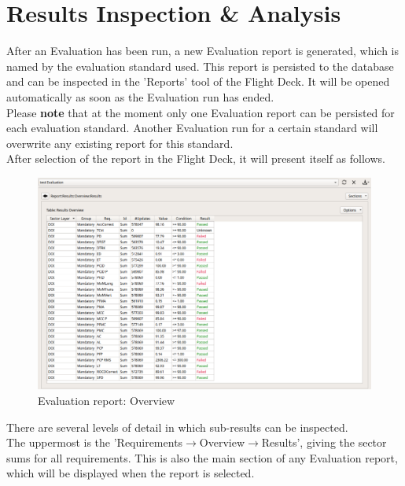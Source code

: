 
\section{Results Inspection \& Analysis}
\label{sec:eval_inspect}

After an Evaluation has been run, a new Evaluation report is generated, which is named by the evaluation standard used. 
This report is persisted to the database and can be inspected in the 'Reports' tool of the Flight Deck.
It will be opened automatically as soon as the Evaluation run has ended. \\

Please \textbf{note} that at the moment only one Evaluation report can be persisted for each evaluation standard.
Another Evaluation run for a certain standard will overwrite any existing report for this standard. \\

After selection of the report in the Flight Deck, it will present itself as follows.

\begin{figure}[H]
  \hspace*{-2cm}
    \includegraphics[width=18cm,frame]{figures/eval_report_overview.png}
  \caption{Evaluation report: Overview}
\end{figure}

There are several levels of detail in which sub-results can be inspected. \\

The uppermost is the 'Requirements$\rightarrow$Overview$\rightarrow$Results', giving the sector sums for all requirements. 
This is also the main section of any Evaluation report, which will be displayed when the report is selected. \\

